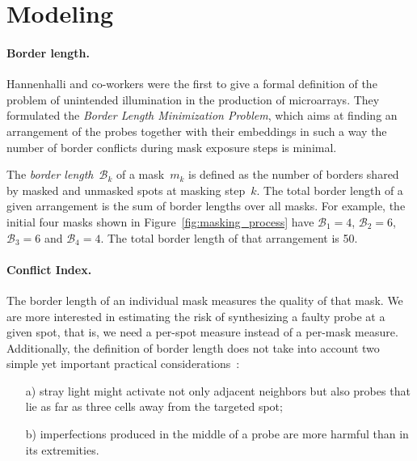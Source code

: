 \documentclass[english]{lni}
\begin{document}
\section{Modeling}
\label{sec:model}

\paragraph{Border length.}
Hannenhalli and co-workers \cite{HANNENHALLI02} were the first to give a formal
definition of the problem
of unintended illumination in the production of microarrays. They formulated the
\emph{Border Length Minimization Problem}, which aims at finding an arrangement
of the probes together with their embeddings in such a way the number of border
conflicts during mask exposure steps is minimal.

The \emph{border length}~$\mathcal{B}_k$ of a mask~$m_{k}$ is
defined as the number of borders shared by masked and unmasked spots
at masking step~$k$. The total border length of a given arrangement is
the sum of border lengths over all masks. For example, the initial four
masks shown in Figure~\ref{fig:masking_process} have
$\mathcal{B}_1 = 4$, $\mathcal{B}_2 = 6$, $\mathcal{B}_3 = 6$ and
$\mathcal{B}_4 = 4$. The total border length of that arrangement is 50.

\paragraph{Conflict Index.}
The border length of an individual mask measures the quality of that
mask. We are more interested in estimating the risk of synthesizing a faulty
probe at a given spot, that is, we need a per-spot measure
instead of a per-mask measure. Additionally,
the definition of border length does not take into account two
simple yet important practical considerations~\cite{KAHNG03A}:
\begin{itemize}
\item[a)] stray light might activate not only adjacent neighbors but
  also probes that lie as far as three cells away from the targeted
  spot;
\item[b)] imperfections produced in the middle of a probe are more
  harmful than in its extremities.
\end{itemize}
\end{document}
